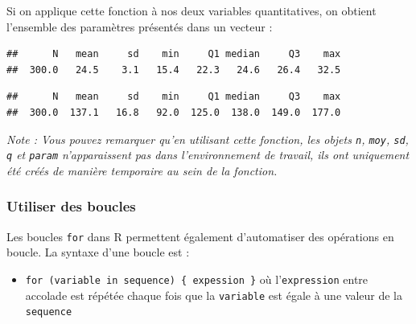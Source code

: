 \documentclass[
]{book}
\newenvironment{Shaded}{\begin{snugshade}}{\end{snugshade}}
\newcommand{\AttributeTok}[1]{\textcolor[rgb]{0.13,0.29,0.53}{#1}}
\newcommand{\ConstantTok}[1]{\textcolor[rgb]{0.56,0.35,0.01}{#1}}
\newcommand{\DecValTok}[1]{\textcolor[rgb]{0.00,0.00,0.81}{#1}}
\newcommand{\FunctionTok}[1]{\textcolor[rgb]{0.13,0.29,0.53}{\textbf{#1}}}
\newcommand{\NormalTok}[1]{#1}
\newcommand{\SpecialCharTok}[1]{\textcolor[rgb]{0.81,0.36,0.00}{\textbf{#1}}}
\providecommand{\tightlist}{%
  \setlength{\itemsep}{0pt}\setlength{\parskip}{0pt}}
\begin{document}
Si on applique cette fonction à nos deux variables quantitatives, on obtient l'ensemble des paramètres présentés dans un vecteur :

\begin{Shaded}
\end{Shaded}

\begin{verbatim}
##      N   mean     sd    min     Q1 median     Q3    max 
##  300.0   24.5    3.1   15.4   22.3   24.6   26.4   32.5
\end{verbatim}

\begin{Shaded}
\end{Shaded}

\begin{verbatim}
##      N   mean     sd    min     Q1 median     Q3    max 
##  300.0  137.1   16.8   92.0  125.0  138.0  149.0  177.0
\end{verbatim}

\emph{Note : Vous pouvez remarquer qu'en utilisant cette fonction, les objets \texttt{n}, \texttt{moy}, \texttt{sd}, \texttt{q} et \texttt{param} n'apparaissent pas dans l'environnement de travail, ils ont uniquement été créés de manière temporaire au sein de la fonction.}

\subsubsection{Utiliser des boucles}\label{utiliser-des-boucles}

Les boucles \texttt{for} dans R permettent également d'automatiser des opérations en boucle. La syntaxe d'une boucle est :

\begin{itemize}
\tightlist
\item
  \texttt{for\ (variable\ in\ sequence)\ \{\ expession\ \}} où l'\texttt{expression} entre accolade est répétée chaque fois que la \texttt{variable} est égale à une valeur de la \texttt{sequence}
\end{itemize}
\end{document}
